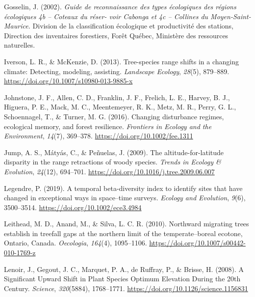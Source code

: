 \documentclass[
  a4paperpaper,
]{article}
\begin{document}
\leavevmode\hypertarget{ref-gosselin_guide_2002}{}%
Gosselin, J. (2002). \emph{Guide de reconnaissance des types écologiques
des régions écologiques 4b -- Coteaux du réser- voir Cabonga et 4c --
Collines du Moyen-Saint-Maurice.} Division de la classification
écologique et productivité des stations, Direction des inventaires
forestiers, Forêt Québec, Ministère des ressources naturelles.

\leavevmode\hypertarget{ref-iverson_tree-species_2013}{}%
Iverson, L. R., \& McKenzie, D. (2013). Tree-species range shifts in a
changing climate: Detecting, modeling, assisting. \emph{Landscape
Ecology}, \emph{28}(5), 879--889.
\url{https://doi.org/10.1007/s10980-013-9885-x}

\leavevmode\hypertarget{ref-johnstone_changing_2016}{}%
Johnstone, J. F., Allen, C. D., Franklin, J. F., Frelich, L. E., Harvey,
B. J., Higuera, P. E., Mack, M. C., Meentemeyer, R. K., Metz, M. R.,
Perry, G. L., Schoennagel, T., \& Turner, M. G. (2016). Changing
disturbance regimes, ecological memory, and forest resilience.
\emph{Frontiers in Ecology and the Environment}, \emph{14}(7), 369--378.
\url{https://doi.org/10.1002/fee.1311}

\leavevmode\hypertarget{ref-jump_altitude-for-latitude_2009}{}%
Jump, A. S., Mátyás, C., \& Peñuelas, J. (2009). The
altitude-for-latitude disparity in the range retractions of woody
species. \emph{Trends in Ecology \& Evolution}, \emph{24}(12), 694--701.
\url{https://doi.org/10.1016/j.tree.2009.06.007}

\leavevmode\hypertarget{ref-legendre_temporal_2019}{}%
Legendre, P. (2019). A temporal beta-diversity index to identify sites
that have changed in exceptional ways in space--time surveys.
\emph{Ecology and Evolution}, \emph{9}(6), 3500--3514.
\url{https://doi.org/10.1002/ece3.4984}

\leavevmode\hypertarget{ref-leithead_northward_2010}{}%
Leithead, M. D., Anand, M., \& Silva, L. C. R. (2010). Northward
migrating trees establish in treefall gaps at the northern limit of the
temperate--boreal ecotone, Ontario, Canada. \emph{Oecologia},
\emph{164}(4), 1095--1106.
\url{https://doi.org/10.1007/s00442-010-1769-z}

\leavevmode\hypertarget{ref-lenoir_significant_2008}{}%
Lenoir, J., Gegout, J. C., Marquet, P. A., de Ruffray, P., \& Brisse, H.
(2008). A Significant Upward Shift in Plant Species Optimum Elevation
During the 20th Century. \emph{Science}, \emph{320}(5884), 1768--1771.
\url{https://doi.org/10.1126/science.1156831}
\end{document}
